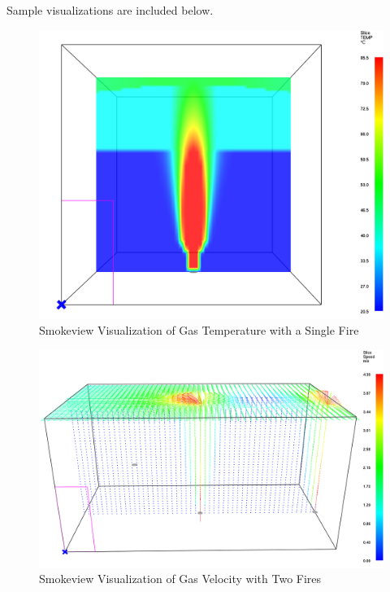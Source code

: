 Sample visualizations are included below.

\begin{figure}[h!]
\begin{center}
\includegraphics[width=6.5in]{FIGURES/Input_File/SMV_Temperature}
Smokeview Visualization of Gas Temperature with a Single Fire
\end{center}
\end{figure}

\begin{figure}[h!]
\begin{center}
\includegraphics[width=6.5in]{FIGURES/Input_File/SMV_Velocity}
Smokeview Visualization of Gas Velocity with Two Fires
\end{center}
\end{figure}

